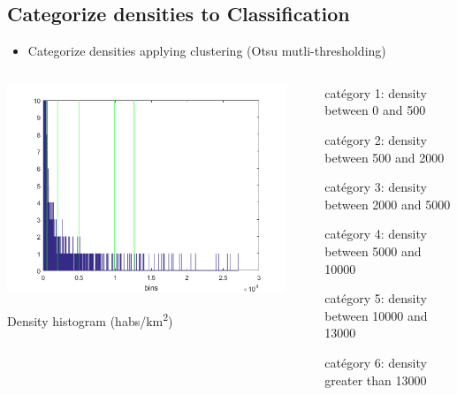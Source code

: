 \documentclass[c]{beamer}
\begin{document}
\subsection{Categorize densities to Classification}
\begin{frame}
\begin{itemize}
 \item Categorize densities applying clustering (Otsu mutli-thresholding)
\end{itemize}

\begin{columns}
 \begin{column}{0.50\textwidth}
  \begin{overlayarea}{\linewidth}{3cm}
  \centering\vfill
  \includegraphics[scale=0.25]{images/labels/densite_histo_otsu_zoom.png}
  \end{overlayarea}
  \begin{overlayarea}{\linewidth}{0.5cm}
  \centering
  \tiny Density histogram (habs/km\textsuperscript{2})\par
  \end{overlayarea}
 \end{column}
 \begin{column}{0.50\textwidth}
  \begin{overlayarea}{\linewidth}{3cm}
  {\tiny
    \begin{itemize}
    \item[catégory 1:] density between 0 and 500
    \item[catégory 2:] density between 500 and 2000
    \item[catégory 3:] density between 2000 and 5000
    \item[catégory 4:] density between 5000 and 10000
    \item[catégory 5:] density between 10000 and 13000
    \item[catégory 6:] density greater than 13000 
    \end{itemize}
  }
  \end{overlayarea}
 \end{column}
\end{columns}


\end{frame}
\end{document}

